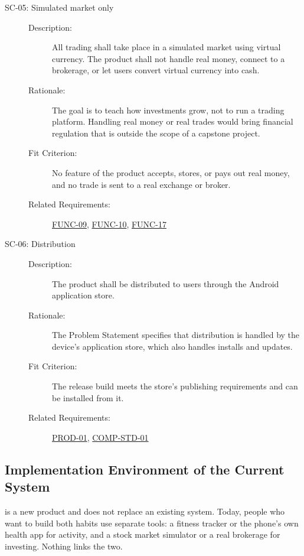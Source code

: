 \documentclass[12pt]{article}
\begin{document}
\begin{description}
  \item[{SC-05\hypertarget{req:SC-05}{}}: Simulated market only]\leavevmode
  \begin{description}
    \item[Description:] All trading shall take place in a simulated market
    using virtual currency. The product shall not handle real money, connect
    to a brokerage, or let users convert virtual currency into cash.
    \item[Rationale:] The goal is to teach how investments grow, not to run a
    trading platform. Handling real money or real trades would bring financial
    regulation that is outside the scope of a capstone project.
    \item[Fit Criterion:] No feature of the product accepts, stores, or pays
    out real money, and no trade is sent to a real exchange or broker.
    \item[Related Requirements:] \hyperlink{req:FUNC-09}{FUNC-09}, \hyperlink{req:FUNC-10}{FUNC-10}, \hyperlink{req:FUNC-17}{FUNC-17}
  \end{description}

  \item[{SC-06\hypertarget{req:SC-06}{}}: Distribution]\leavevmode
  \begin{description}
    \item[Description:] The product shall be distributed to users through the
    Android application store.
    \item[Rationale:] The Problem Statement specifies that distribution is
    handled by the device's application store, which also handles installs and
    updates.
    \item[Fit Criterion:] The release build meets the store's publishing
    requirements and can be installed from it.
    \item[Related Requirements:] \hyperlink{req:PROD-01}{PROD-01}, \hyperlink{req:COMP-STD-01}{COMP-STD-01}
  \end{description}
\end{description}
\subsection{Implementation Environment of the Current System}

\progname{} is a new product and does not replace an existing system. Today,
people who want to build both habits use separate tools: a fitness tracker or
the phone's own health app for activity, and a stock market simulator or a real
brokerage for investing. Nothing links the two.
\end{document}
